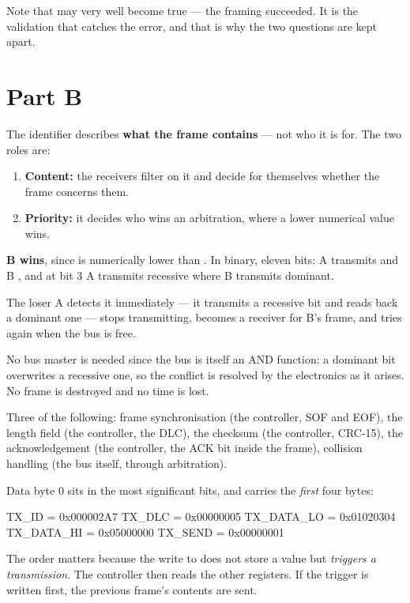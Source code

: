 Note that  may very well become true --- the framing succeeded. It is the
validation that catches the error, and that is why the two questions are kept apart.

\section*{Part B}

 The identifier describes \textbf{what the frame contains} --- not who it is for. The two
roles are:
\begin{enumerate}
  \item \textbf{Content:} the receivers filter on it and decide for themselves whether the frame
    concerns them.
  \item \textbf{Priority:} it decides who wins an arbitration, where a lower numerical value wins.
\end{enumerate}

 \textbf{B wins}, since  is numerically lower than . In binary,
eleven bits: A transmits  and B , and at bit 3 A transmits
recessive where B transmits dominant.

The loser A detects it immediately --- it transmits a recessive bit and reads back a dominant one
--- stops transmitting, becomes a receiver for B's frame, and tries again when the bus is free.

No bus master is needed since the bus is itself an AND function: a dominant bit overwrites a
recessive one, so the conflict is resolved by the electronics as it arises. No frame is destroyed
and no time is lost.

 Three of the following: frame synchronisation (the controller, SOF and EOF), the length
field (the controller, the DLC), the checksum (the controller, CRC-15), the acknowledgement (the
controller, the ACK bit inside the frame), collision handling (the bus itself, through
arbitration).

 Data byte 0 sits in the most significant bits, and  carries the
\emph{first} four bytes:

\begin{console}
TX_ID      = 0x000002A7
TX_DLC     = 0x00000005
TX_DATA_LO = 0x01020304
TX_DATA_HI = 0x05000000
TX_SEND    = 0x00000001
\end{console}

The order matters because the write to  does not store a value but \emph{triggers a
transmission}. The controller then reads the other registers. If the trigger is written first, the
previous frame's contents are sent.

